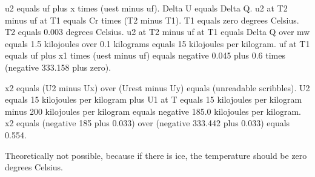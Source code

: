 u2 equals uf plus x times (uest minus uf).
Delta U equals Delta Q.
u2 at T2 minus uf at T1 equals Cr times (T2 minus T1).
T1 equals zero degrees Celsius.
T2 equals 0.003 degrees Celsius.
u2 at T2 minus uf at T1 equals Delta Q over mw equals 1.5 kilojoules over 0.1 kilograms equals 15 kilojoules per kilogram.
uf at T1 equals uf plus x1 times (uest minus uf) equals negative 0.045 plus 0.6 times (negative 333.158 plus zero).

x2 equals (U2 minus Ux) over (Urest minus Uy) equals (unreadable scribbles).
U2 equals 15 kilojoules per kilogram plus U1 at T equals 15 kilojoules per kilogram minus 200 kilojoules per kilogram equals negative 185.0 kilojoules per kilogram.
x2 equals (negative 185 plus 0.033) over (negative 333.442 plus 0.033) equals 0.554.

Theoretically not possible, because if there is ice, the temperature should be zero degrees Celsius.
